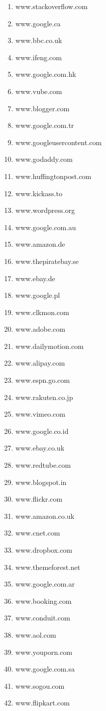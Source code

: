 \begin{enumerate}
\item www.stackoverflow.com
\item www.google.ca
\item www.bbc.co.uk
\item www.ifeng.com
\item www.google.com.hk
\item www.vube.com
\item www.blogger.com
\item www.google.com.tr
\item www.googleusercontent.com
\item www.godaddy.com
\item www.huffingtonpost.com
\item www.kickass.to
\item www.wordpress.org
\item www.google.com.au
\item www.amazon.de
\item www.thepiratebay.se
\item www.ebay.de
\item www.google.pl
\item www.clkmon.com
\item www.adobe.com
\item www.dailymotion.com
\item www.alipay.com
\item www.espn.go.com
\item www.rakuten.co.jp
\item www.vimeo.com
\item www.google.co.id
\item www.ebay.co.uk
\item www.redtube.com
\item www.blogspot.in
\item www.flickr.com
\item www.amazon.co.uk
\item www.cnet.com
\item www.dropbox.com
\item www.themeforest.net
\item www.google.com.ar
\item www.booking.com
\item www.conduit.com
\item www.aol.com
\item www.youporn.com
\item www.google.com.sa
\item www.sogou.com
\item www.flipkart.com

\end{enumerate}
